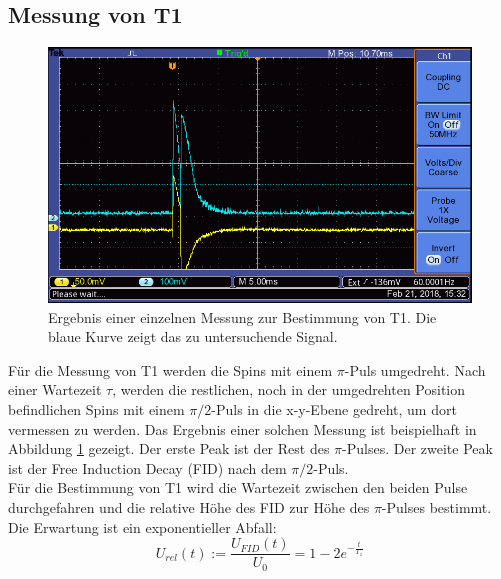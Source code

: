 \documentclass[12pt,a4paper]{article}
\begin{document}
\subsection{Messung von T1}

\begin{figure}
\centering
\includegraphics[scale=0.8]{Bilder/F0003TEK.PNG}
\caption{Ergebnis einer einzelnen Messung zur Bestimmung von T1. Die blaue Kurve zeigt das zu untersuchende Signal.}
\label{fig:MessungT1_Beispiel}
\end{figure}

Für die Messung von T1 werden die Spins mit einem $\pi$-Puls umgedreht. Nach einer Wartezeit $\tau$, werden die restlichen, noch in der umgedrehten Position befindlichen Spins mit einem $\pi /2$-Puls in die x-y-Ebene gedreht, um dort vermessen zu werden. Das Ergebnis einer solchen Messung ist beispielhaft in Abbildung \ref{fig:MessungT1_Beispiel} gezeigt. Der erste Peak ist der Rest des $\pi$-Pulses. Der zweite Peak ist der Free Induction Decay (FID) nach dem $\pi /2$-Puls. \\
Für die Bestimmung von T1 wird die Wartezeit zwischen den beiden Pulse durchgefahren und die relative Höhe des FID zur Höhe des $\pi$-Pulses bestimmt. Die Erwartung ist ein exponentieller Abfall:
\begin{equation}
\label{T1_Exponentialfunktion}
U_{rel} (t) := \dfrac{U_{FID} (t)}{U_0} = 1 - 2 e^{-\frac{t}{T_1}}
\end{equation}
\end{document}
